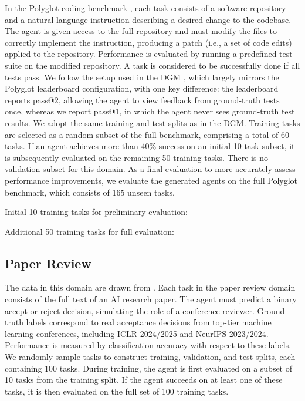 \documentclass[]{fairmeta}
\begin{document}
In the Polyglot coding benchmark \citep{gauthier2024polyglot}, each task consists of a software repository and a natural language instruction describing a desired change to the codebase. The agent is given access to the full repository and must modify the files to correctly implement the instruction, producing a patch (i.e., a set of code edits) applied to the repository. Performance is evaluated by running a predefined test suite on the modified repository. A task is considered to be successfully done if all tests pass. We follow the setup used in the DGM \citep{zhang2025darwin}, which largely mirrors the Polyglot leaderboard configuration, with one key difference: the leaderboard reports pass@2, allowing the agent to view feedback from ground-truth tests once, whereas we report pass@1, in which the agent never sees ground-truth test results. We adopt the same training and test splits as in the DGM. Training tasks are selected as a random subset of the full benchmark, comprising a total of 60 tasks. If an agent achieves more than 40\% success on an initial 10-task subset, it is subsequently evaluated on the remaining 50 training tasks. There is no validation subset for this domain. As a final evaluation to more accurately assess performance improvements, we evaluate the generated agents on the full Polyglot benchmark, which consists of 165 unseen tasks.

Initial 10 training tasks for preliminary evaluation:

Additional 50 training tasks for full evaluation:


\subsection{Paper Review}
\label{app:domain-paperreview}

The data in this domain are drawn from \citet{zhao2026apres}. Each task in the paper review domain consists of the full text of an AI research paper. The agent must predict a binary accept or reject decision, simulating the role of a conference reviewer. Ground-truth labels correspond to real acceptance decisions from top-tier machine learning conferences, including ICLR 2024/2025 and NeurIPS 2023/2024. Performance is measured by classification accuracy with respect to these labels. We randomly sample tasks to construct training, validation, and test splits, each containing 100 tasks. During training, the agent is first evaluated on a subset of 10 tasks from the training split. If the agent succeeds on at least one of these tasks, it is then evaluated on the full set of 100 training tasks.
\end{document}
